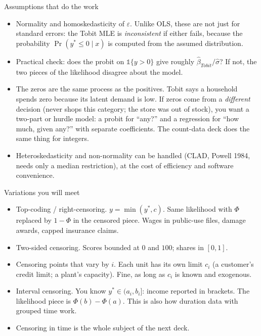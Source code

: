 \documentclass[aspectratio=169,11pt]{beamer}
\begin{document}
\begin{frame}{Assumptions that do the work}
\begin{itemize}
	\item \alert{Normality} and \alert{homoskedasticity} of $\varepsilon$. Unlike OLS, these are not just
	for standard errors: the Tobit MLE is \emph{inconsistent} if either fails, because the probability
	$\Pr(y^* \le 0 \mid x)$ is computed from the assumed distribution.
	\medskip
	\item Practical check: does the probit on $\mathbb{1}\{y > 0\}$ give roughly $\hat\beta_{Tobit}/\hat\sigma$?
	If not, the two pieces of the likelihood disagree about the model.
	\medskip
	\item \alert{The zeros are the same process as the positives.} Tobit says a household spends zero
	because its latent demand is low. If zeros come from a \emph{different} decision (never shops
	this category; the store was out of stock), you want a two-part or hurdle model: a probit for
	``any?'' and a regression for ``how much, given any?'' with separate coefficients. The count-data
	deck does the same thing for integers.
	\medskip
	\item Heteroskedasticity and non-normality can be handled (CLAD, Powell 1984, needs only a median
	restriction), at the cost of efficiency and software convenience.
\end{itemize}
\end{frame}


\begin{frame}{Variations you will meet}
\begin{itemize}
	\item \alert{Top-coding / right-censoring.} $y = \min(y^*, c)$. Same likelihood with $\Phi$ replaced
	by $1 - \Phi$ in the censored piece. Wages in public-use files, damage awards, capped insurance claims.
	\medskip
	\item \alert{Two-sided censoring.} Scores bounded at $0$ and $100$; shares in $[0, 1]$.
	\medskip
	\item \alert{Censoring points that vary by $i$.} Each unit has its own limit $c_i$ (a customer's
	credit limit; a plant's capacity). Fine, as long as $c_i$ is known and exogenous.
	\medskip
	\item \alert{Interval censoring.} You know $y^* \in (a_i, b_i]$: income reported in brackets.
	The likelihood piece is $\Phi(b) - \Phi(a)$. This is also how duration data with grouped time work.
	\medskip
	\item \alert{Censoring in time} is the whole subject of the next deck.
\end{itemize}
\end{frame}
\end{document}
